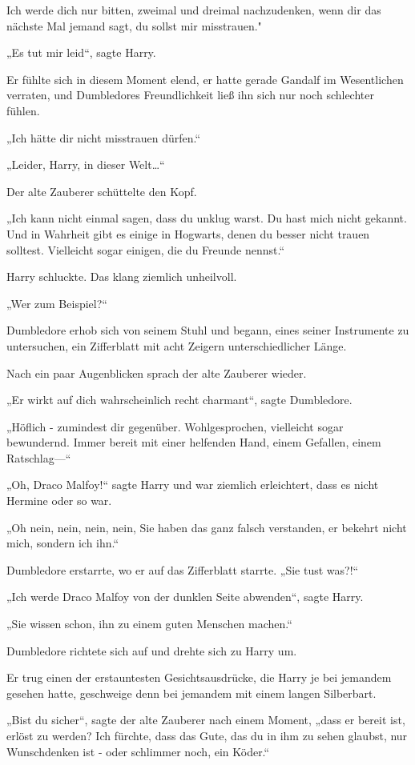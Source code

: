 {Ich werde dich nur bitten, zweimal und dreimal nachzudenken, wenn dir das nächste Mal jemand sagt, du sollst mir misstrauen."

„Es tut mir leid“, sagte Harry.

Er fühlte sich in diesem Moment elend, er hatte gerade Gandalf im Wesentlichen verraten, und Dumbledores Freundlichkeit ließ ihn sich nur noch schlechter fühlen.

„Ich hätte dir nicht misstrauen dürfen.“

„Leider, Harry, in dieser Welt…“

Der alte Zauberer schüttelte den Kopf.

„Ich kann nicht einmal sagen, dass du unklug warst. Du hast mich nicht gekannt. Und in Wahrheit gibt es einige in Hogwarts, denen du besser nicht trauen solltest. Vielleicht sogar einigen, die du Freunde nennst.“

Harry schluckte. Das klang ziemlich unheilvoll.

„Wer zum Beispiel?“

Dumbledore erhob sich von seinem Stuhl und begann, eines seiner Instrumente zu untersuchen, ein Zifferblatt mit acht Zeigern unterschiedlicher Länge.

Nach ein paar Augenblicken sprach der alte Zauberer wieder.

„Er wirkt auf dich wahrscheinlich recht charmant“, sagte Dumbledore.

„Höflich - zumindest dir gegenüber. Wohlgesprochen, vielleicht sogar bewundernd. Immer bereit mit einer helfenden Hand, einem Gefallen, einem Ratschlag—“

„Oh, Draco Malfoy!“ sagte Harry und war ziemlich erleichtert, dass es nicht Hermine oder so war.

„Oh nein, nein, nein, nein, Sie haben das ganz falsch verstanden, er bekehrt nicht mich, sondern ich ihn.“

Dumbledore erstarrte, wo er auf das Zifferblatt starrte. „Sie tust was?!“

„Ich werde Draco Malfoy von der dunklen Seite abwenden“, sagte Harry.

„Sie wissen schon, ihn zu einem guten Menschen machen.“

Dumbledore richtete sich auf und drehte sich zu Harry um.

Er trug einen der erstauntesten Gesichtsausdrücke, die Harry je bei jemandem gesehen hatte, geschweige denn bei jemandem mit einem langen Silberbart.

„Bist du sicher“, sagte der alte Zauberer nach einem Moment, „dass er bereit ist, erlöst zu werden? Ich fürchte, dass das Gute, das du in ihm zu sehen glaubst, nur Wunschdenken ist - oder schlimmer noch, ein Köder.“

}
